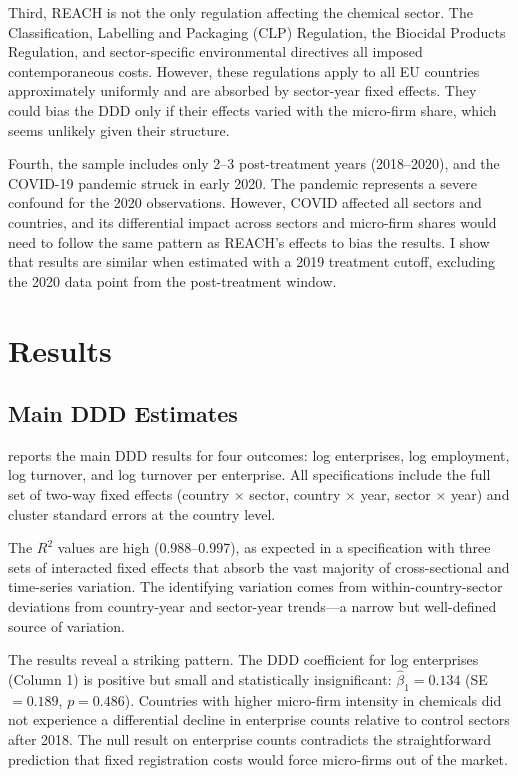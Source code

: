 \documentclass[12pt]{article}
\begin{document}
Third, REACH is not the only regulation affecting the chemical sector. The Classification, Labelling and Packaging (CLP) Regulation, the Biocidal Products Regulation, and sector-specific environmental directives all imposed contemporaneous costs. However, these regulations apply to all EU countries approximately uniformly and are absorbed by sector-year fixed effects. They could bias the DDD only if their effects varied with the micro-firm share, which seems unlikely given their structure.

Fourth, the sample includes only 2--3 post-treatment years (2018--2020), and the COVID-19 pandemic struck in early 2020. The pandemic represents a severe confound for the 2020 observations. However, COVID affected all sectors and countries, and its differential impact across sectors and micro-firm shares would need to follow the same pattern as REACH's effects to bias the results. I show that results are similar when estimated with a 2019 treatment cutoff, excluding the 2020 data point from the post-treatment window.


\section{Results}
\label{sec:results}

\subsection{Main DDD Estimates}

 reports the main DDD results for four outcomes: log enterprises, log employment, log turnover, and log turnover per enterprise. All specifications include the full set of two-way fixed effects (country $\times$ sector, country $\times$ year, sector $\times$ year) and cluster standard errors at the country level.



The $R^2$ values are high (0.988--0.997), as expected in a specification with three sets of interacted fixed effects that absorb the vast majority of cross-sectional and time-series variation. The identifying variation comes from within-country-sector deviations from country-year and sector-year trends---a narrow but well-defined source of variation.

The results reveal a striking pattern. The DDD coefficient for log enterprises (Column 1) is positive but small and statistically insignificant: $\hat{\beta}_1 = 0.134$ (SE $= 0.189$, $p = 0.486$). Countries with higher micro-firm intensity in chemicals did not experience a differential decline in enterprise counts relative to control sectors after 2018. The null result on enterprise counts contradicts the straightforward prediction that fixed registration costs would force micro-firms out of the market.
\end{document}
